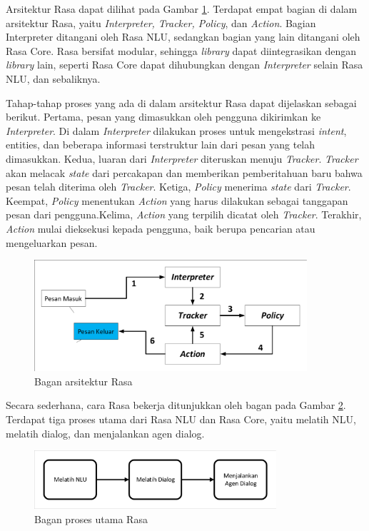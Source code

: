 Arsitektur Rasa dapat dilihat pada Gambar \ref{fig:rasa_arch}. Terdapat empat bagian di dalam arsitektur Rasa, yaitu \textit{Interpreter, Tracker, Policy}, dan \textit{Action}. Bagian Interpreter ditangani oleh Rasa NLU, sedangkan bagian yang lain ditangani oleh Rasa Core. Rasa bersifat modular, sehingga \textit{library} dapat diintegrasikan dengan \textit{library} lain, seperti Rasa Core dapat dihubungkan dengan \textit{Interpreter} selain Rasa NLU, dan sebaliknya.

Tahap-tahap proses yang ada di dalam arsitektur Rasa dapat dijelaskan sebagai berikut. Pertama, pesan yang dimasukkan oleh pengguna dikirimkan ke \textit{Interpreter}. Di dalam \textit{Interpreter} dilakukan proses untuk mengekstrasi \textit{intent}, entities, dan beberapa informasi terstruktur lain dari pesan yang telah dimasukkan. Kedua, luaran dari \textit{Interpreter} diteruskan menuju \textit{Tracker}. \textit{Tracker} akan melacak \textit{state} dari percakapan dan memberikan pemberitahuan baru bahwa pesan telah diterima oleh \textit{Tracker}. Ketiga, \textit{Policy} menerima  \textit{state} dari \textit{Tracker}. Keempat, \textit{Policy} menentukan \textit{Action} yang harus dilakukan sebagai tanggapan pesan dari pengguna.Kelima, \textit{Action} yang terpilih dicatat oleh \textit{Tracker}. Terakhir, \textit{Action} mulai dieksekusi kepada pengguna, baik berupa pencarian atau mengeluarkan pesan.

\begin{figure}[H]
	\centering
	\includegraphics[width=0.9\textwidth, trim=2 2 2 2, clip]{resources/2/rasa_arch.pdf}
	\caption{Bagan arsitektur Rasa \parencite{bocklisch2017rasa}}
	\label{fig:rasa_arch}
\end{figure}

Secara sederhana, cara Rasa bekerja ditunjukkan oleh bagan pada Gambar \ref{fig:rasa_process}. Terdapat tiga proses utama dari Rasa NLU dan Rasa Core, yaitu melatih NLU, melatih dialog, dan menjalankan agen dialog.

\begin{figure}[H]
	\centering
	\includegraphics[width=0.8\textwidth, trim=2 2 2 2, clip]{resources/2/rasa_process.pdf}
	\caption{Bagan proses utama Rasa}
	\label{fig:rasa_process}
\end{figure}


